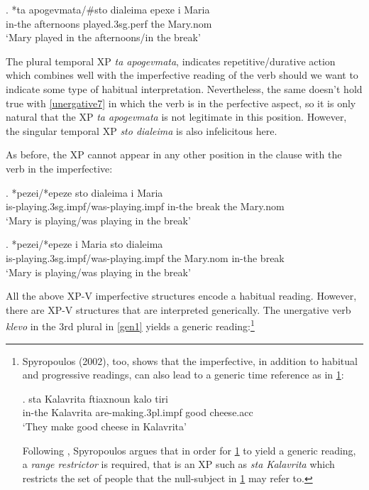 \documentclass[11pt]{article}
\begin{document}
\exg.
*ta apogevmata/\#sto dialeima epexe i Maria\\
in-the afternoons played.3sg.perf the Mary.nom\label{unergative7}\\
`Mary played in the afternoons/in the break'


The plural temporal XP \textit{ta apogevmata}, indicates repetitive/durative action which combines well with the imperfective reading of the verb should we want to indicate some type of habitual interpretation. Nevertheless, the same doesn't hold true with \ref{unergative7} in which the verb is in the perfective aspect, so it is only natural that the XP \textit{ta apogevmata} is not legitimate in this position. However, the singular temporal XP \textit{sto dialeima} is also infelicitous here.

As before, the XP cannot appear in any other position in the clause with the verb in the imperfective:

\exg.
 *pezei/*epeze sto dialeima i Maria\\
 is-playing.3sg.impf/was-playing.impf in-the break the Mary.nom\label{unergative61}\\
`Mary is playing/was playing in the break'

\exg.
 *pezei/*epeze i Maria sto dialeima\\
 is-playing.3sg.impf/was-playing.impf  the Mary.nom in-the break\label{unergative62}\\
`Mary is playing/was playing in the break'

All the above XP-V imperfective structures encode a habitual reading. However, there are XP-V structures that are interpreted generically. The unergative verb  \textit{klevo} in the 3rd plural in \ref{gen1} yields a generic reading:\footnote{Spyropoulos (2002), too, shows that the imperfective, in addition to habitual and progressive readings, can also lead to a generic time reference as in \ref{spyropoulos2}:

\exg.
sta Kalavrita ftiaxnoun kalo tiri\\
in-the Kalavrita are-making.3pl.impf good cheese.acc\\ \label{spyropoulos2}
`They make good cheese in Kalavrita'

\hfill \citet[pp. 3]{spyropoulos:02}

Following \citet{cardinaletti-starke:99}, Spyropoulos argues that in order for \ref{spyropoulos2} to yield a generic reading, a \textit{range restrictor} is required, that is an XP such as \textit{sta Kalavrita} which restricts the set of people that the null-subject in \ref{spyropoulos2} may refer to.}
\end{document}
